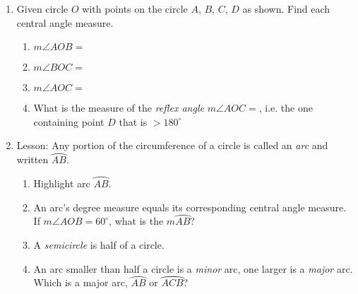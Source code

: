 \documentclass[12pt, twoside]{article}
\begin{document}
\begin{enumerate}
\newpage
\item Given circle $O$ with points on the circle $A$, $B$, $C$, $D$ as shown. Find each central angle measure.
  \begin{multicols}{2}
    \begin{enumerate} 
      \item $m\angle AOB =$
      \item $m\angle BOC =$
      \item $m\angle AOC =$
      \item What is the measure of the \emph{reflex angle} $m\angle AOC =$, i.e. the one containing point $D$ that is $>180^\circ$
      \end{enumerate}
  \end{multicols}

\newpage
\item Lesson: Any portion of the circumference of a circle is called an \emph{arc} and written $\wideparen{AB}$.
    \begin{multicols}{2}
    \raggedcolumns
    \begin{enumerate}[itemsep=0.5cm]
      \item Highlight arc $\wideparen{AB}$.
      \item An arc's degree measure equals its corresponding central angle measure. \\[0.25cm]
      If $m\angle AOB = 60^\circ$, what is the $m \wideparen{AB}$?
      \item A \emph{semicircle} is half of a circle.
      \item An arc smaller than half a circle is a \emph{minor} arc, one larger is a \emph{major} arc. \\[0.25cm]
      Which is a major arc, $\wideparen{AB}$ or $\wideparen{ACB}$?
    \end{enumerate}
    \end{multicols}


\end{enumerate}
\end{document}
